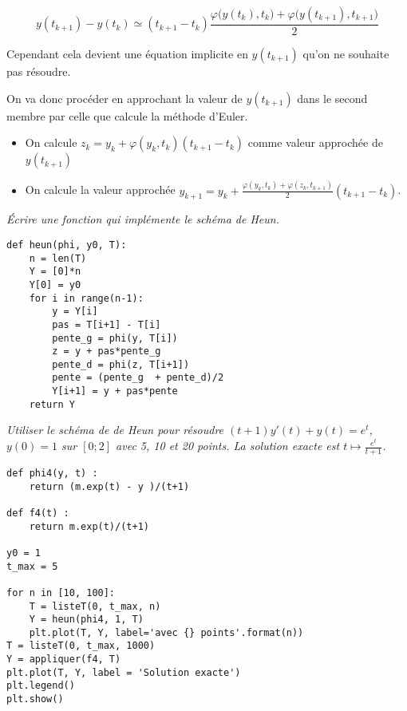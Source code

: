 \[ y(t_{k+1})-y(t_k)\simeq  (t_{k+1}-t_k) \frac {\varphi\bigl(y(t_k),t_k\bigr)+\varphi\bigl(y(t_{k+1}),t_{k+1}\bigr)}2 \]

Cependant cela devient une équation implicite en $y(t_{k+1})$ qu'on ne souhaite pas résoudre.

On va donc procéder en approchant la valeur de $y(t_{k+1})$ dans le second membre par celle que calcule la méthode d'Euler.
\begin{itemize}
\item On calcule $z_k=y_k+\varphi(y_k,t_k)(t_{k+1}-t_k)$ comme valeur approchée de $y(t_{k+1})$
\item On calcule la valeur approchée $\displaystyle y_{k+1} = y_k +
\frac{\varphi(y_k,t_k)+\varphi(z_k,t_{k+1})} 2 (t_{k+1}-t_k)$.
\end{itemize}
\begin{Exercise}\it
Écrire une fonction  qui implémente le schéma de Heun.
\end{Exercise}
\begin{Answer}
\begin{lstlisting}
def heun(phi, y0, T):
    n = len(T)
    Y = [0]*n
    Y[0] = y0 
    for i in range(n-1):
        y = Y[i]
        pas = T[i+1] - T[i]
        pente_g = phi(y, T[i])
        z = y + pas*pente_g
        pente_d = phi(z, T[i+1])
        pente = (pente_g  + pente_d)/2
        Y[i+1] = y + pas*pente
    return Y
\end{lstlisting}
\newpage
\end{Answer}
\begin{Exercise}\it
Utiliser le schéma de de Heun pour résoudre $(t+1)y'(t)+y(t)=e^t$, $y(0)=1$ sur $[0;2]$ avec 5, 10 et 20 points.
La solution exacte est $t\mapsto \frac{e^t}{t+1}$.
\end{Exercise}
\begin{Answer}
\begin{lstlisting}
def phi4(y, t) :
    return (m.exp(t) - y )/(t+1)

def f4(t) :
    return m.exp(t)/(t+1)

y0 = 1
t_max = 5

for n in [10, 100]:
    T = listeT(0, t_max, n)
    Y = heun(phi4, 1, T)
    plt.plot(T, Y, label='avec {} points'.format(n))
T = listeT(0, t_max, 1000)
Y = appliquer(f4, T)
plt.plot(T, Y, label = 'Solution exacte')
plt.legend()
plt.show()
\end{lstlisting}
\end{Answer}

